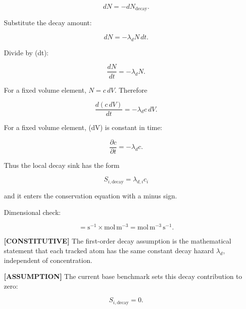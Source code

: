 \documentclass[11pt,a4paper]{article}
\begin{document}
\begin{equation}
dN=-dN_{\mathrm{decay}}.
\tag{TRISO-GOV-106}
\label{eq:triso-gov-106}
\end{equation}

Substitute the decay amount:

\begin{equation}
dN=-\lambda_dN\,dt.
\tag{TRISO-GOV-107}
\label{eq:triso-gov-107}
\end{equation}

Divide by (dt):

\begin{equation}
\frac{dN}{dt}=-\lambda_dN.
\tag{TRISO-GOV-108}
\label{eq:triso-gov-108}
\end{equation}

For a fixed volume element, $N=c\,dV$. Therefore

\begin{equation}
\frac{d(c\,dV)}{dt}=-\lambda_dc\,dV.
\tag{TRISO-GOV-109}
\label{eq:triso-gov-109}
\end{equation}

For a fixed volume element, (dV) is constant in time:

\begin{equation}
\frac{\partial c}{\partial t}=-\lambda_dc.
\tag{TRISO-GOV-110}
\label{eq:triso-gov-110}
\end{equation}

Thus the local decay sink has the form

\begin{equation}
\boxed{
S_{i,\mathrm{decay}}=\lambda_{d,i}c_i
}
\tag{TRISO-GOV-111}
\label{eq:triso-gov-111}
\end{equation}

and it enters the conservation equation with a minus sign.

Dimensional check:

\begin{equation}
[\lambda_dc]
=
\mathrm{s^{-1}}\times\mathrm{mol\,m^{-3}}
=
\mathrm{mol\,m^{-3}\,s^{-1}}.
\tag{TRISO-GOV-112}
\label{eq:triso-gov-112}
\end{equation}

\textbf{[CONSTITUTIVE]} The first-order decay assumption is the mathematical statement that each tracked atom has the same constant decay hazard $\lambda_d$, independent of concentration.

\textbf{[ASSUMPTION]} The current base benchmark sets this decay contribution to zero:

\begin{equation}
S_{i,\mathrm{decay}}=0.
\tag{TRISO-GOV-113}
\label{eq:triso-gov-113}
\end{equation}
\end{document}
